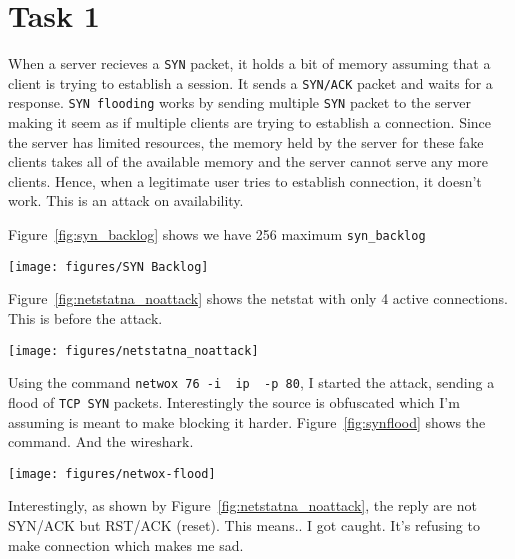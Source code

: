 \chapter{Task 1}
\label{ch:task1}

When a server recieves a \texttt{SYN} packet, it holds a bit of memory assuming that a client is trying to establish a session. It sends a \texttt{SYN/ACK} packet and waits for a response. \texttt{SYN flooding} works by sending multiple \texttt{SYN} packet to the server making it seem as if multiple clients are trying to establish a connection. Since the server has limited resources, the memory held by the server for these fake clients takes all of the available memory and the server cannot serve any more clients. Hence, when a legitimate user tries to establish connection, it doesn't work. This is an attack on availability. 

Figure~\ref{fig:syn_backlog} shows we have 256 maximum \texttt{syn_backlog}

\begin{figure*}[h]
\centering
  \texttt{[image: figures/SYN Backlog]}
  \caption{Size of \texttt{SYN} Backlog}
\label{fig:syn_backlog}
\end{figure*}

Figure~\ref{fig:netstatna_noattack} shows the netstat with only 4 active connections. This is before the attack.

\begin{figure*}[h]
\centering
\texttt{[image: figures/netstatna\_noattack]}
  \caption{Size of \texttt{SYN} Backlog}
\label{fig:netstatna_noattack}
\end{figure*}


Using the command \texttt{netwox 76 -i ~ip~ -p 80}, I started the attack, sending a flood of \texttt{TCP SYN} packets. Interestingly the source is obfuscated which I'm assuming is meant to make blocking it harder. Figure~\ref{fig:synflood} shows the command. And the wireshark.

\begin{figure*}[h]
\centering
  \texttt{[image: figures/netwox-flood]}
  \caption{SYN Flood}
\label{fig:synflood}
\end{figure*}

Interestingly, as shown by Figure~\ref{fig:netstatna_noattack}, the reply are not SYN/ACK but RST/ACK (reset). This means.. I got caught. It's refusing to make connection which makes me sad.

